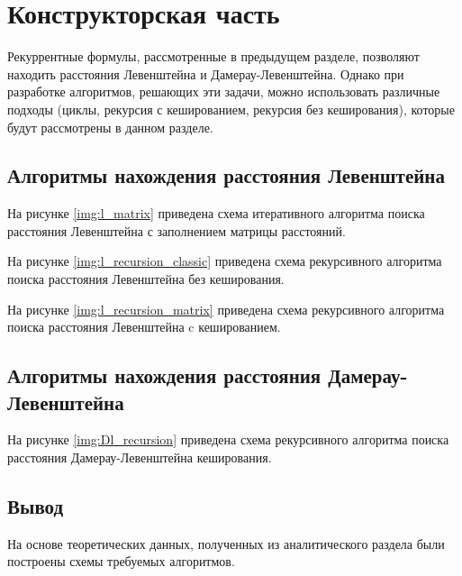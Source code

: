 \chapter{Конструкторская часть}

Рекуррентные формулы, рассмотренные в предыдущем разделе, позволяют находить расстояния Левенштейна и Дамерау-Левенштейна. Однако при разработке алгоритмов, решающих эти задачи, можно использовать различные подходы (циклы, рекурсия с кешированием, рекурсия без кеширования), которые будут рассмотрены в данном разделе.

\section{Алгоритмы нахождения расстояния Левенштейна}

На рисунке \ref{img:l_matrix} приведена схема итеративного алгоритма поиска расстояния Левенштейна с заполнением матрицы расстояний.


На рисунке \ref{img:l_recursion_classic} приведена схема рекурсивного алгоритма поиска расстояния Левенштейна без кеширования.


На рисунке \ref{img:l_recursion_matrix} приведена схема рекурсивного алгоритма поиска расстояния Левенштейна c кешированием.


\section{Алгоритмы нахождения расстояния Дамерау-Левенштейна}

На рисунке \ref{img:Dl_recursion} приведена схема рекурсивного алгоритма поиска расстояния Дамерау-Левенштейна кеширования.




\section*{Вывод}

На основе теоретических данных, полученных из аналитического раздела были построены схемы требуемых алгоритмов.



